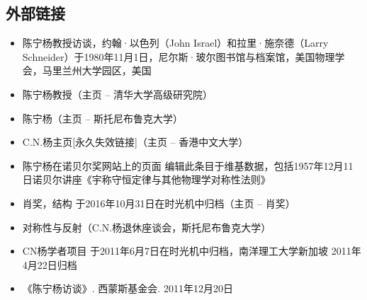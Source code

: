 \subsection{外部链接}
\begin{itemize}
\item 陈宁杨教授访谈，约翰·以色列（John Israel）和拉里·施奈德（Larry Schneider）于1980年11月1日，尼尔斯·玻尔图书馆与档案馆，美国物理学会，马里兰州大学园区，美国  
\item 陈宁杨教授（主页 – 清华大学高级研究院）  
\item 陈宁杨（主页 – 斯托尼布鲁克大学）  
\item C.N.杨主页[永久失效链接]（主页 – 香港中文大学）  
\item 陈宁杨在诺贝尔奖网站上的页面 编辑此条目于维基数据，包括1957年12月11日诺贝尔讲座《宇称守恒定律与其他物理学对称性法则》  
\item 肖奖，结构 于2016年10月31日在时光机中归档（主页 – 肖奖）  
\item 对称性与反射（C.N.杨退休座谈会，斯托尼布鲁克大学）  
\item CN杨学者项目 于2011年6月7日在时光机中归档，南洋理工大学新加坡 2011年4月22日归档  
\item 《陈宁杨访谈》. 西蒙斯基金会. 2011年12月20日
\end{itemize}